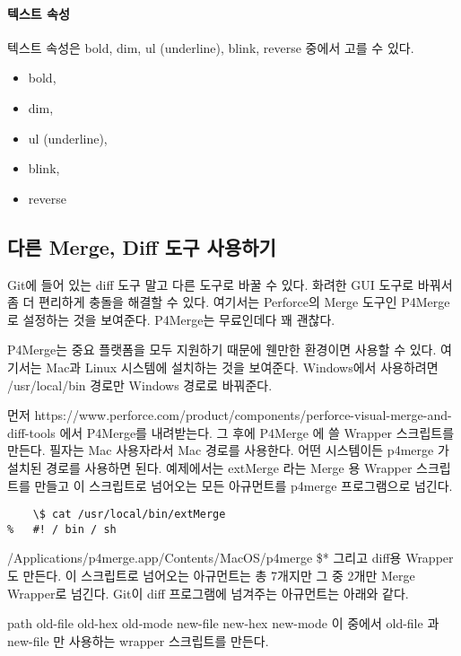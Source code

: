 \documentclass[12pt, a4paper, oneside]{book}
\begin{document}
\paragraph 	{텍스트 속성}

텍스트 속성은 bold, dim, ul (underline), blink, reverse 중에서 고를 수 있다.

			\begin{itemize}	[	
								topsep=0.0em,
								itemsep=0.0em,
								leftmargin=4em, 
								labelsep=3em 
								]
			\item	bold, 
			\item	dim, 
			\item	ul (underline), 
			\item	blink, 
			\item	reverse 
			\end{itemize}	



\subsection{다른 Merge, Diff 도구 사용하기}


Git에 들어 있는 diff 도구 말고 다른 도구로 바꿀 수 있다. 화려한 GUI 도구로 바꿔서 좀 더 편리하게 충돌을 해결할 수 있다. 여기서는 Perforce의 Merge 도구인 P4Merge로 설정하는 것을 보여준다. P4Merge는 무료인데다 꽤 괜찮다.

P4Merge는 중요 플랫폼을 모두 지원하기 때문에 웬만한 환경이면 사용할 수 있다. 여기서는 Mac과 Linux 시스템에 설치하는 것을 보여준다. Windows에서 사용하려면 /usr/local/bin 경로만 Windows 경로로 바꿔준다.

먼저 https://www.perforce.com/product/components/perforce-visual-merge-and-diff-tools 에서 P4Merge를 내려받는다. 
그 후에 P4Merge 에 쓸 Wrapper 스크립트를 만든다. 
필자는 Mac 사용자라서 Mac 경로를 사용한다. 
어떤 시스템이든 p4merge 가 설치된 경로를 사용하면 된다. 
예제에서는 extMerge 라는 Merge 용 Wrapper 스크립트를 만들고 이 스크립트로 넘어오는 모든 아규먼트를 p4merge 프로그램으로 넘긴다.

\begin{verbatim}
	\$ cat /usr/local/bin/extMerge
%	#! / bin / sh
\end{verbatim}

/Applications/p4merge.app/Contents/MacOS/p4merge \$*
그리고 diff용 Wrapper도 만든다. 이 스크립트로 넘어오는 아규먼트는 총 7개지만 그 중 2개만 Merge Wrapper로 넘긴다. Git이 diff 프로그램에 넘겨주는 아규먼트는 아래와 같다.

path old-file old-hex old-mode new-file new-hex new-mode
이 중에서 old-file 과 new-file 만 사용하는 wrapper 스크립트를 만든다.
\end{document}
